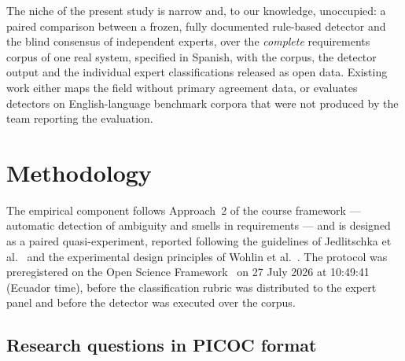 \documentclass[pdflatex,sn-mathphys-num]{sn-jnl}
\theoremstyle{thmstyleone}%
\theoremstyle{thmstyletwo}%
\theoremstyle{thmstylethree}%
\begin{document}
	The niche of the present study is narrow and, to our knowledge, unoccupied: a
	paired comparison between a frozen, fully documented rule-based detector and the
	blind consensus of independent experts, over the \emph{complete} requirements
	corpus of one real system, specified in Spanish, with the corpus, the detector
	output and the individual expert classifications released as open data. Existing
	work either maps the field without primary agreement data, or evaluates
	detectors on English-language benchmark corpora that were not produced by the
	team reporting the evaluation.
	
	
	\section{Methodology}\label{sec:method}
	
	The empirical component follows Approach~2 of the course framework ---
	automatic detection of ambiguity and smells in requirements --- and is designed
	as a paired quasi-experiment, reported following the guidelines of Jedlitschka
	et al.~\cite{jedlitschka2008} and the experimental design principles of Wohlin
	et al.~\cite{wohlin2012}. The protocol was preregistered on the Open Science
	Framework~\cite{nosek2018} on 27 July 2026 at 10:49:41 (Ecuador time), before
	the classification rubric was distributed to the expert panel and before the
	detector was executed over the corpus.
	
	\subsection{Research questions in PICOC format}\label{subsec:picoc}
	
\end{document}
